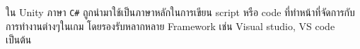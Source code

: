 \enskip \enskip \enskip ใน Unity ภาษา \texttt{C\#} ถูกนำมาใช้เป็นภาษาหลักในการเขียน script หรือ code ที่ทำหน้าที่จัดการกับการทำงานต่างๆในเกม
โดยรองรับหลากหลาย Framework เช่น Visual studio, VS code เป็นต้น








